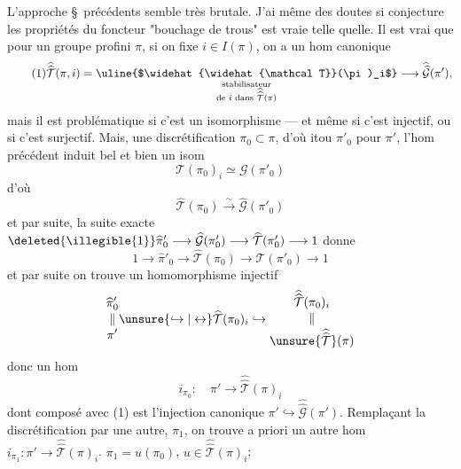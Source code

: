 L'approche  \S\ précédents semble  très brutale. J'ai même des doutes si   conjecture  les propriétés du foncteur "bouchage de trous" est vraie telle quelle. Il est vrai que pour un groupe profini    $\pi$, si on fixe $i\in I(\pi)$, on a un hom canonique
\[
\tag{1}
\widehat{\widehat{\mathcal T}}(\pi,i)
=\underset{\substack{\text{stabilisateur}\\\text{de }i\text{ dans }\widehat{\widehat{\mathcal T}}(\pi)}}{\text{\uline{$\widehat{\widehat{\mathcal T}}(\pi)_i$}}}
\longrightarrow \widehat{\widehat{\mathcal G}}(\pi'),
\]
mais il est problématique si c'est un isomorphisme --- et même si c'est injectif, ou si c'est surjectif. Mais,  une discrétification $\pi_0\subset\pi$, d'où itou $\pi'_0$ pour $\pi'$, l'hom précédent induit bel et bien un isom
\[
\tag{1}
\mathcal T(\pi_0)_i\simeq\mathcal G(\pi'_0)
\]
d'où
\[
\tag{3}
\widehat{\mathcal T}(\pi_0)\xrightarrow{\sim}\widehat{\mathcal G}(\pi'_0)
\]
et par suite, la suite exacte $\deleted{\illegible{1}}\widehat{\pi}'_0\longrightarrow\widehat{\mathcal G}(\pi'_0)\longrightarrow\widehat{\mathcal T}(\pi'_0)\longrightarrow 1$ donne
\[
\tag{4}
1\longrightarrow\widehat{\pi}'_0\longrightarrow\widehat{\mathcal T}(\pi_0)\longrightarrow\widehat{\mathcal T}(\pi'_0)\longrightarrow 1
\]
et par suite on trouve un homomorphisme injectif
\[
\begin{gathered}\widehat{\pi}'_0\\[-0.5ex]\Vert\\[-0.5ex]\pi'\end{gathered}
\unsure{\hookrightarrow|\leftrightarrow}
\widehat{\mathcal T}(\pi_0)_i
\hookrightarrow
\begin{gathered}\widehat{\widehat{\mathcal T}}(\pi_0)_i\\[-0.5ex]\Vert\\[-0.5ex]\unsure{\widehat{\widehat{\mathcal T}}}(\pi)\end{gathered}
\]
donc un hom
\[
\tag{5}
i_{\pi_0}:\quad\pi'\longrightarrow\widehat{\widehat{\mathcal T}}(\pi)_i
\]
dont  composé avec (1) est l'injection canonique $\pi'\hookrightarrow\widehat{\widehat{\mathcal G}}(\pi')$. Remplaçant la discrétification  par une autre, $\pi_1$, on trouve a priori un autre hom $i_{\pi_1}:\pi'\longrightarrow\widehat{\widehat{\mathcal T}}(\pi)_i$.  $\pi_1=u(\pi_0)$, $u\in\widehat{\widehat{\mathcal T}}(\pi)_i$;

